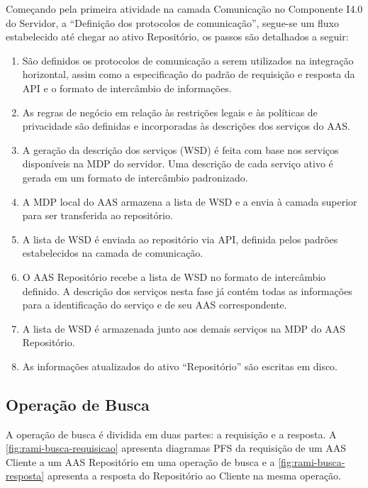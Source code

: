 	Começando pela primeira atividade na camada Comunicação no Componente I4.0 do Servidor, a ``Definição dos protocolos de comunicação'', segue-se um fluxo estabelecido até chegar ao ativo Repositório, os passos são detalhados a seguir:
	
	\begin{enumerate}
		
		\item São definidos os protocolos de comunicação a serem utilizados na integração horizontal, assim como a especificação do padrão de requisição e resposta da API e o formato de intercâmbio de informações.
		
		\item As regras de negócio em relação às restrições legais e às políticas de privacidade são definidas e incorporadas às descrições dos serviços do AAS.
		
		\item A geração da descrição dos serviços (WSD) é feita com base nos serviços disponíveis na MDP do servidor. Uma descrição de cada serviço ativo é gerada em um formato de intercâmbio padronizado.
		
		\item A MDP local do AAS armazena a lista de WSD e a envia à camada superior para ser transferida ao repositório.
	
		\item A lista de WSD é enviada ao repositório via API, definida pelos padrões estabelecidos na camada de comunicação.
		
		\item O AAS Repositório recebe a lista de WSD no formato de intercâmbio definido. A descrição dos serviços nesta fase já contém todas as informações para a identificação do serviço e de seu AAS correspondente.
		
		\item A lista de WSD é armazenada junto aos demais serviços na MDP do AAS Repositório.
		
		\item As informações atualizados do ativo ``Repositório'' são escritas em disco.
	\end{enumerate}

\subsection{Operação de Busca}

	A operação de busca é dividida em duas partes: a requisição e a resposta. A \autoref{fig:rami-busca-requisicao} apresenta diagramas PFS da requisição de um AAS Cliente a um AAS Repositório em uma operação de busca e a \autoref{fig:rami-busca-resposta} apresenta a resposta do Repositório ao Cliente na mesma operação.
	
